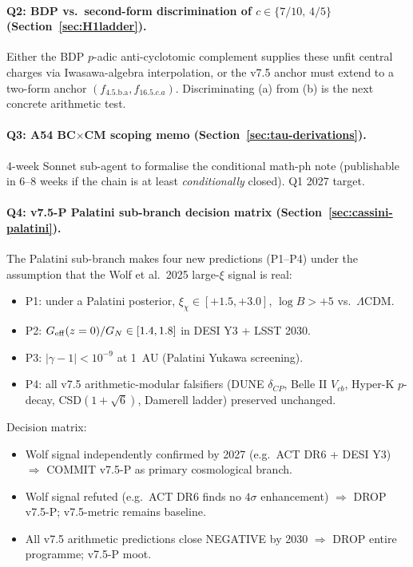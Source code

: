 \documentclass[a4paper,11pt]{article}
\newcommand{\fLM}{f_{\text{4.5.b.a}}}
\theoremstyle{definition}
\theoremstyle{remark}
\begin{document}
\paragraph{Q2: BDP vs.\ second-form discrimination of
$c\in\{7/10,\,4/5\}$ (Section~\ref{sec:H1ladder}).}  Either
the BDP $p$-adic anti-cyclotomic complement supplies these
unfit central charges via Iwasawa-algebra interpolation, or
the v7.5 anchor must extend to a two-form anchor
$(\fLM, f_{16.5.c.a})$.  Discriminating (a) from (b) is the
next concrete arithmetic test.

\paragraph{Q3: A54 BC$\times$CM scoping memo
(Section~\ref{sec:tau-derivations}).}  4-week Sonnet sub-agent
to formalise the conditional math-ph note (publishable in
6--8 weeks if the chain is at least \emph{conditionally}
closed).  Q1 2027 target.

\paragraph{Q4: v7.5-P Palatini sub-branch decision matrix
(Section~\ref{sec:cassini-palatini}).}  The Palatini
sub-branch makes four new predictions (P1--P4) under the
assumption that the Wolf et al.\ 2025 large-$\xi$ signal
\cite{Wolf25} is real:
\begin{itemize}
  \item P1: under a Palatini posterior, $\xi_\chi\in[+1.5,+3.0]$,
    $\log B>+5$ vs.\ $\Lambda$CDM.
  \item P2: $G_{\rm eff}(z=0)/G_{N}\in[1.4,1.8]$ in DESI Y3 +
    LSST 2030.
  \item P3: $|\gamma-1|<10^{-9}$ at 1~AU (Palatini Yukawa
    screening).
  \item P4: all v7.5 arithmetic-modular falsifiers
    (DUNE $\delta_{CP}$, Belle II $V_{cb}$, Hyper-K $p$-decay,
    CSD$(1+\sqrt 6)$, Damerell ladder) preserved unchanged.
\end{itemize}
\noindent
Decision matrix:
\begin{itemize}
  \item Wolf signal independently confirmed by 2027 (e.g.\ ACT
    DR6 + DESI Y3) $\Rightarrow$ COMMIT v7.5-P as primary
    cosmological branch.
  \item Wolf signal refuted (e.g.\ ACT DR6 finds no
    $4\sigma$ enhancement) $\Rightarrow$ DROP v7.5-P; v7.5-metric
    remains baseline.
  \item All v7.5 arithmetic predictions close NEGATIVE by 2030
    $\Rightarrow$ DROP entire programme; v7.5-P moot.
\end{itemize}
\end{document}
